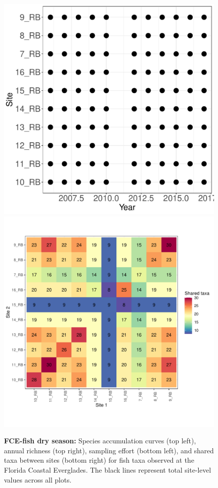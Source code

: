 \documentclass[11pt, oneside]{article}
\begin{document}
\begin{figure}[h!]
\includegraphics[scale = 0.4]{fce-fish-RehageDry_spatiotemporal_sampling_effort.pdf}
\includegraphics[scale = 0.4]{fce-fish-RehageDry_spp_shared.pdf}
\caption{{\bf FCE-fish dry season:} Species accumulation curves (top left),  annual richness (top right), sampling effort (bottom left), and shared taxa between sites (bottom right) for fish taxa observed at the Florida Coastal Everglades. The black lines represent total site-level values across all plots.}
\label{fce-fish-dry}
\end{figure}
\end{document}
